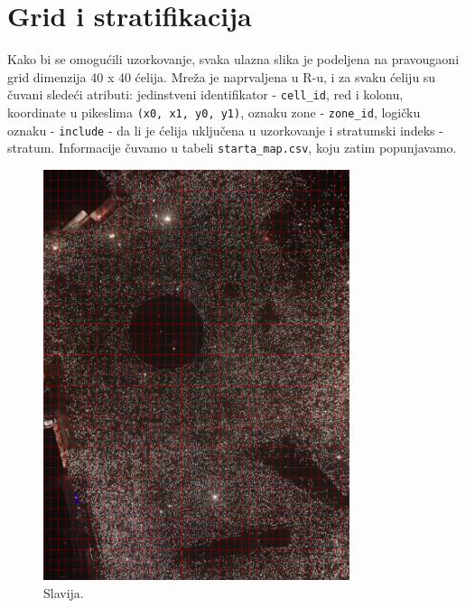 \documentclass[a4paper,12pt]{article}
\begin{document}
\newpage
\section{Grid i stratifikacija}

Kako bi se omogućili uzorkovanje, svaka ulazna slika je podeljena na pravougaoni grid dimenzija 40 x 40 ćelija. 
Mreža je naprvaljena u R-u, i za svaku ćeliju su čuvani sledeći atributi: 
jedinstveni identifikator - \texttt{cell\_id}, red i kolonu, koordinate u pikeslima \texttt{(x0, x1, y0, y1)}, oznaku zone - \texttt{zone\_id}, 
logičku oznaku - \texttt{include} - da li je ćelija uključena u uzorkovanje i stratumski indeks - stratum.
Informacije čuvamo u tabeli \texttt{starta\_map.csv}, koju zatim popunjavamo.

\begin{figure}[H] 
	\centering 
	\includegraphics[width=0.8\textwidth]{../grid_output/slavija-centar_grid.png} 
	\caption{Slavija.} 
	\label{fig:slavija} 
\end{figure}
\end{document}
